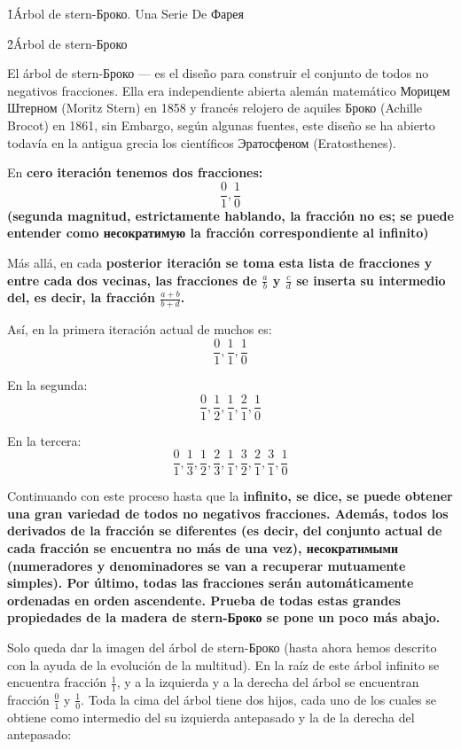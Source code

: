 \h1{Árbol de stern-Броко. Una Serie De Фарея}

\h2{Árbol de stern-Броко}

El árbol de stern-Броко --- es el diseño para construir el conjunto de todos no negativos fracciones. Ella era independiente abierta alemán matemático Морицем Штерном (Moritz Stern) en 1858 y francés relojero de aquiles Броко (Achille Brocot) en 1861, sin Embargo, según algunas fuentes, este diseño se ha abierto todavía en la antigua grecia los científicos Эратосфеном (Eratosthenes).

En \bf{cero} iteración tenemos dos fracciones:
$$ \frac{0}{1}, \frac{1}{0} $$
(segunda magnitud, estrictamente hablando, la fracción no es; se puede entender como несократимую la fracción correspondiente al infinito)

Más allá, en cada \bf{posterior} iteración se toma esta lista de fracciones y entre cada dos vecinas, las fracciones de $\frac{a}{b}$ y $\frac{c}{d}$ se inserta su \bf{intermedio del}, es decir, la fracción $\frac{a+b}{b+d}$.

Así, en la primera iteración actual de muchos es:
$$ \frac{0}{1}, \frac{1}{1}, \frac{1}{0} $$

En la segunda:
$$ \frac{0}{1}, \frac{1}{2}, \frac{1}{1}, \frac{2}{1}, \frac{1}{0} $$

En la tercera:
$$ \frac{0}{1}, \frac{1}{3}, \frac{1}{2}, \frac{2}{3}, \frac{1}{1}, \frac{3}{2}, \frac{2}{1}, \frac{3}{1}, \frac{1}{0} $$

Continuando con este proceso hasta que la \bf{infinito}, se dice, se puede obtener una gran variedad de \bf{todos} no negativos fracciones. Además, todos los derivados de la fracción se \bf{diferentes} (es decir, del conjunto actual de cada fracción se encuentra no más de una vez), \bf{несократимыми} (numeradores y denominadores se van a recuperar mutuamente simples). Por último, todas las fracciones serán automáticamente \bf{ordenadas} en orden ascendente. Prueba de todas estas grandes propiedades de la madera de stern-Броко se pone un poco más abajo.

Solo queda dar la imagen del árbol de stern-Броко (hasta ahora hemos descrito con la ayuda de la evolución de la multitud). En la raíz de este árbol infinito se encuentra fracción $\frac{1}{1}$, y a la izquierda y a la derecha del árbol se encuentran fracción $\frac{0}{1}$ y $\frac{1}{0}$. Toda la cima del árbol tiene dos hijos, cada uno de los cuales se obtiene como intermedio del su izquierda antepasado y la de la derecha del antepasado:

